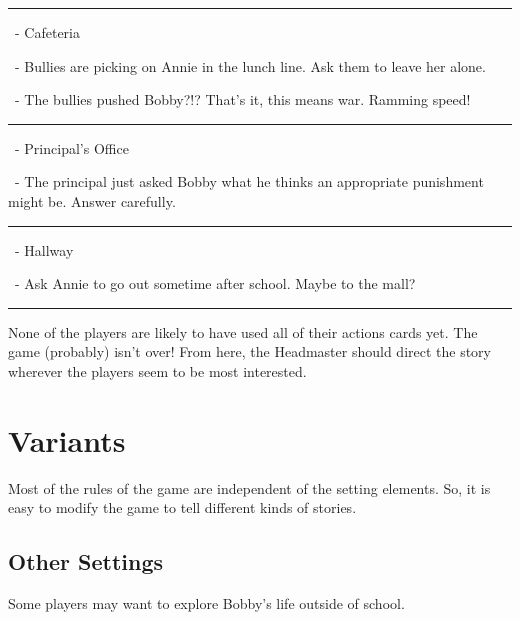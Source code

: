 \documentclass[a4paper, 10pt,notumble]{leaflet}
\DeclareRobustCommand\spades[1][black]{\textcolor{#1}{\cardfont{\}}}}
\DeclareRobustCommand\hearts[1][red]{\textcolor{#1}{{\cardfont{\{}}}}
\DeclareRobustCommand\diamonds[1][red]{\textcolor{#1}{{\cardfont{[}}}}
\DeclareRobustCommand\clubs[1][black]{\textcolor{#1}{\cardfont{]}}}
\DeclareRobustCommand\six[1][black]{\textcolor{#1}{\cardfont{6}}}
\DeclareRobustCommand\seven[1][black]{\textcolor{#1}{\cardfont{7}}}
\DeclareRobustCommand\redfive[1][red]{\textcolor{#1}{\cardfont{5}}}
\DeclareRobustCommand\redsix[1][red]{\textcolor{#1}{\cardfont{6}}}
\DeclareRobustCommand\redseven[1][red]{\textcolor{#1}{\cardfont{7}}}
\DeclareRobustCommand\redeight[1][red]{\textcolor{#1}{\cardfont{8}}}
\DeclareRobustCommand\redten[1][red]{\textcolor{#1}{\cardfont{=}}}
\begin{document}
\begin{description}[topsep=0pt, labelindent=0pt, leftmargin=0.0cm]
	\rule{\textwidth}{1pt}

	
	\item[Location 4\normalfont{:}] \redfive\diamonds\ - Cafeteria
	\smallskip
	\begin{description}[labelindent = 0.5cm, leftmargin=0.75cm]
		\item[Challenge 4a\normalfont{:}] \redeight\hearts\ - Bullies are picking on Annie in the lunch line. Ask them to leave her alone.
		\item[Challenge 4b\normalfont{:}] \six\clubs\ - The bullies pushed Bobby?!? That's it, this means war. Ramming speed! 
	\end{description}
	
	\rule{\textwidth}{1pt}
	
	\item[Location 5\normalfont{:}] \redsix\diamonds\ - Principal's Office
	\smallskip
	\begin{description}[labelindent = 0.5cm, leftmargin=0.75cm]
		\item[Challenge 5a\normalfont{:}] \seven\spades\ - The principal just asked Bobby what he thinks an appropriate punishment might be. Answer carefully.
	\end{description}
	
	\rule{\textwidth}{1pt}
	
	\item[Location 6\normalfont{:}] \redseven\diamonds\ - Hallway
	\smallskip
	\begin{description}[labelindent = 0.5cm, leftmargin=0.75cm]
		\item[Challenge 6a\normalfont{:}] \redten\hearts\ - Ask Annie to go out sometime after school. Maybe to the mall?
	\end{description}
	
	\rule{\textwidth}{1pt}

\end{description}
\medskip
None of the players are likely to have used all of their actions cards yet. The game (probably) isn't over! From here, the Headmaster should direct the story wherever the players seem to be most interested.

\newpage
\section{Variants}
Most of the rules of the game are independent of the setting elements. So, it is easy to modify the game to tell different kinds of stories.

\subsection{Other Settings}
Some players may want to explore Bobby's life outside of school. 
\end{document}
